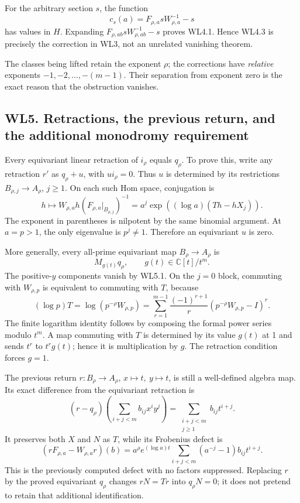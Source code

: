 For the arbitrary section \(s\), the function \[
 c_s(a)=F_{\rho,a}sW_{\rho,a}^{-1}-s
\tag{WL4.4}
\] has values in \(H\). Expanding \(F_{\rho,ab}sW_{\rho,ab}^{-1}-s\)
proves WL4.1. Hence WL4.3 is precisely the correction in WL3, not an
unrelated vanishing theorem.

The classes being lifted retain the exponent \(\rho\); the corrections
have \emph{relative} exponents \(-1,-2,\ldots,-(m-1)\). Their separation
from exponent zero is the exact reason that the obstruction vanishes.

\subsection{WL5. Retractions, the previous return, and the additional
monodromy
requirement}\label{wl5.-retractions-the-previous-return-and-the-additional-monodromy-requirement}

Every equivariant linear retraction of \(i_\rho\) equals \(q_\rho\). To
prove this, write any retraction \(r'\) as \(q_\rho+u\), with
\(u i_\rho=0\). Thus \(u\) is determined by its restrictions
\(B_{\rho,j}\to A_\rho\), \(j\geq1\). On each such Hom space,
conjugation is \[
 h\longmapsto W_{\rho,a}h(F_{\rho,a}|_{B_{\rho,j}})^{-1}
 =a^j\exp((\log a)(Th-hX_j)).
\tag{WL5.1}
\] The exponent in parentheses is nilpotent by the same binomial
argument. At \(a=p>1\), the only eigenvalue is \(p^j\ne1\). Therefore an
equivariant \(u\) is zero.

More generally, every all-prime equivariant map \(B_\rho\to A_\rho\) is
\[
 M_{g(t)}q_\rho,\qquad g(t)\in\mathbb C[t]/t^m.
\tag{WL5.2}
\] The positive-\(y\) components vanish by WL5.1. On the \(j=0\) block,
commuting with \(W_{\rho,p}\) is equivalent to commuting with \(T\),
because \[
 (\log p)T=\log(p^{-\rho}W_{\rho,p})
 =\sum_{r=1}^{m-1}\frac{(-1)^{r+1}}r
 (p^{-\rho}W_{\rho,p}-I)^r.
\tag{WL5.3}
\] The finite logarithm identity follows by composing the formal power
series modulo \(t^m\). A map commuting with \(T\) is determined by its
value \(g(t)\) at 1 and sends \(t^r\) to \(t^rg(t)\); hence it is
multiplication by \(g\). The retraction condition forces \(g=1\).

The previous return \(r:B_\rho\to A_\rho\), \(x\mapsto t,\ y\mapsto t\),
is still a well-defined algebra map. Its exact difference from the
equivariant retraction is \[
 (r-q_\rho)\left(\sum_{i+j<m}b_{ij}x^iy^j\right)
 =\sum_{\substack{i+j<m\\j\geq1}}b_{ij}t^{i+j}.
\tag{WL5.4}
\] It preserves both \(X\) and \(N\) as \(T\), while its Frobenius
defect is \[
 (rF_{\rho,a}-W_{\rho,a}r)(b)
 =
 a^\rho e^{(\log a)t}
 \sum_{i+j<m}(a^{-j}-1)b_{ij}t^{i+j}.
\tag{WL5.5}
\] This is the previously computed defect with no factors suppressed.
Replacing \(r\) by the proved equivariant \(q_\rho\) changes \(rN=Tr\)
into \(q_\rho N=0\); it does not pretend to retain that additional
identification.

